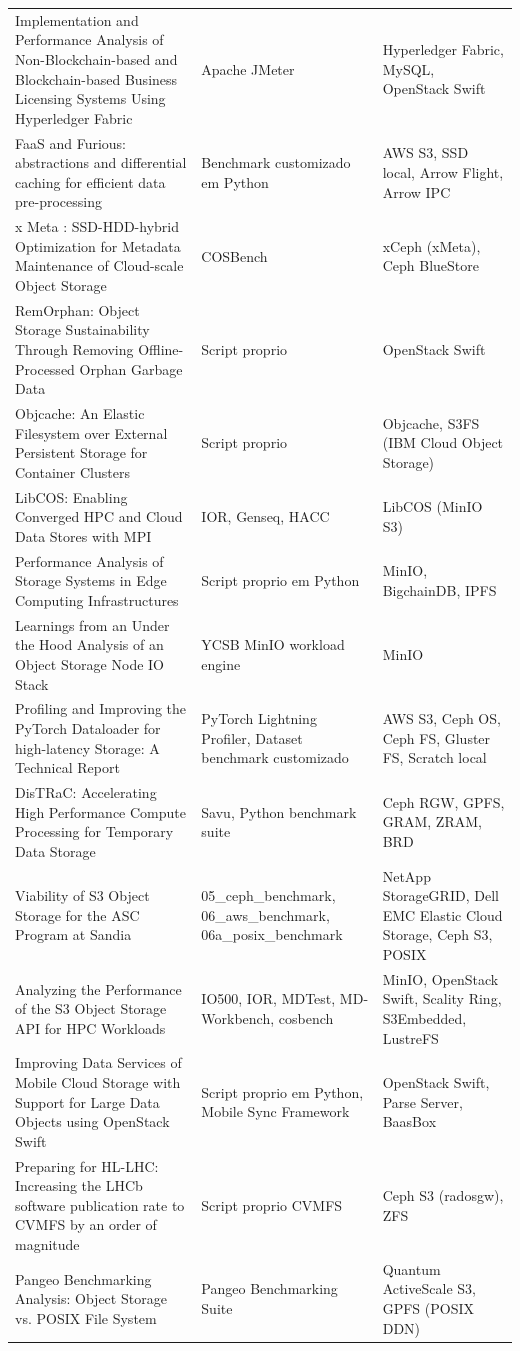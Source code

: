 {\begin{longtable}{@{}p{6.4cm}p{4.3cm}p{4.3cm}@{}}
Implementation and Performance Analysis of Non-Blockchain-based and Blockchain-based Business Licensing Systems Using Hyperledger Fabric & Apache JMeter & Hyperledger Fabric, MySQL, OpenStack Swift \\
FaaS and Furious: abstractions and differential caching for efficient data pre-processing & Benchmark customizado em Python & AWS S3, SSD local, Arrow Flight, Arrow IPC \\
x Meta : SSD-HDD-hybrid Optimization for Metadata Maintenance of Cloud-scale Object Storage & COSBench & xCeph (xMeta), Ceph BlueStore \\
RemOrphan: Object Storage Sustainability Through Removing Offline-Processed Orphan Garbage Data & Script proprio & OpenStack Swift \\
Objcache: An Elastic Filesystem over External Persistent Storage for Container Clusters & Script proprio & Objcache, S3FS (IBM Cloud Object Storage) \\
LibCOS: Enabling Converged HPC and Cloud Data Stores with MPI & IOR, Genseq, HACC & LibCOS (MinIO S3) \\
Performance Analysis of Storage Systems in Edge Computing Infrastructures & Script proprio em Python & MinIO, BigchainDB, IPFS \\
Learnings from an Under the Hood Analysis of an Object Storage Node IO Stack & YCSB MinIO workload engine & MinIO \\
Profiling and Improving the PyTorch Dataloader for high-latency Storage: A Technical Report & PyTorch Lightning Profiler, Dataset benchmark customizado & AWS S3, Ceph OS, Ceph FS, Gluster FS, Scratch local \\
DisTRaC: Accelerating High Performance Compute Processing for Temporary Data Storage & Savu, Python benchmark suite & Ceph RGW, GPFS, GRAM, ZRAM, BRD \\
Viability of S3 Object Storage for the ASC Program at Sandia & 05\_ceph\_benchmark, 06\_aws\_benchmark, 06a\_posix\_benchmark & NetApp StorageGRID, Dell EMC Elastic Cloud Storage, Ceph S3, POSIX \\
Analyzing the Performance of the S3 Object Storage API for HPC Workloads & IO500, IOR, MDTest, MD-Workbench, cosbench & MinIO, OpenStack Swift, Scality Ring, S3Embedded, LustreFS \\
Improving Data Services of Mobile Cloud Storage with Support for Large Data Objects using OpenStack Swift & Script proprio em Python, Mobile Sync Framework & OpenStack Swift, Parse Server, BaasBox \\
Preparing for HL-LHC: Increasing the LHCb software publication rate to CVMFS by an order of magnitude & Script proprio CVMFS & Ceph S3 (radosgw), ZFS \\
Pangeo Benchmarking Analysis: Object Storage vs. POSIX File System & Pangeo Benchmarking Suite & Quantum ActiveScale S3, GPFS (POSIX DDN) \\
\end{longtable}
}
